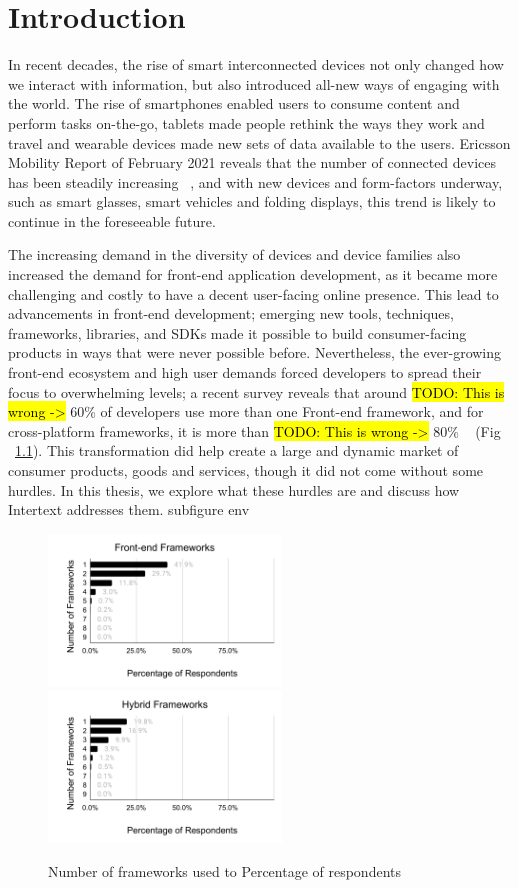 
\chapter{Introduction} \label{introduction}

In recent decades, the rise of smart interconnected devices not only changed how we interact with information, but also introduced all-new ways of engaging with the world. The rise of smartphones enabled users to consume content and perform tasks on-the-go, tablets made people rethink the ways they work and travel and wearable devices made new sets of data available to the users. Ericsson Mobility Report of February 2021 reveals that the number of connected devices has been steadily increasing ~\cite{EricssonMobility2020}, and with new devices and form-factors underway, such as smart glasses, smart vehicles and folding displays, this trend is likely to continue in the foreseeable future. 

The increasing demand in the diversity of devices and device families also increased the demand for front-end application development, as it became more challenging and costly to have a decent user-facing online presence. This lead to advancements in front-end development; emerging new tools, techniques, frameworks, libraries, and SDKs made it possible to build consumer-facing products in ways that were never possible before. Nevertheless, the ever-growing front-end ecosystem and high user demands forced developers to spread their focus to overwhelming levels; a recent survey reveals that around \hl{TODO: This is wrong ->} 60\% of developers use more than one Front-end framework, and for cross-platform frameworks, it is more than \hl{TODO: This is wrong ->} 80\% ~\cite{StateOfJs2020} (Fig ~\ref{fig:num_of_frameworks_used}). This transformation did help create a large and dynamic market of consumer products, goods and services, though it did not come without some hurdles. In this thesis, we explore what these hurdles are and discuss how Intertext addresses them.
subfigure env
\begin{figure}
  \centering
  \includegraphics[width=6.2cm]{images/sojs1.pdf}
  \,
  \includegraphics[width=6.2cm]{images/sojs2.pdf}
  \caption{Number of frameworks used to Percentage of respondents}%
  \label{fig:num_of_frameworks_used}%
\end{figure}

